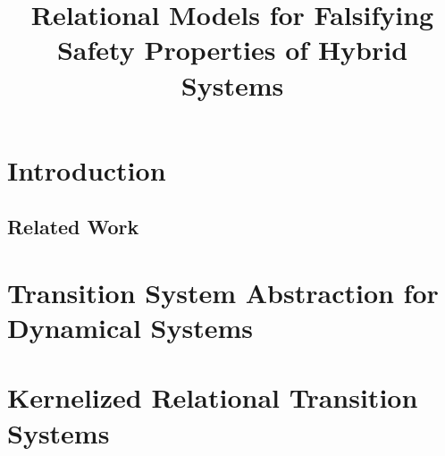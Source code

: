 \documentclass[9pt,sigconf]{acmart}
\begin{document}



\title{Relational Models for Falsifying Safety Properties of Hybrid Systems}






\begin{abstract}

\end{abstract}

\maketitle

\section{Introduction}
\label{sec:intro}



\subsection{Related Work}
\label{sec:rel}


\section{Transition System Abstraction for Dynamical Systems}
\label{sec:scam}


\section{Kernelized Relational Transition Systems}
\label{sec:scamr}

\end{document}
